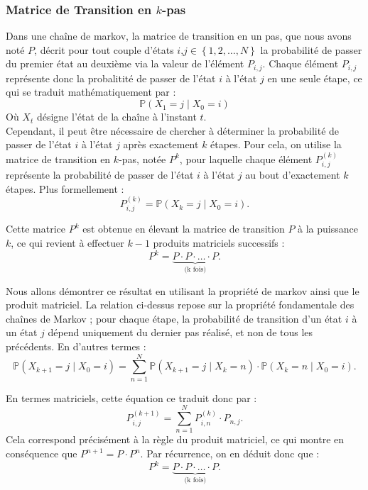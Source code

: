 \documentclass{article}
\begin{document}
\subsubsection{Matrice de Transition en \texorpdfstring{$k$}{k}-pas} %
Dans une chaîne de markov, la matrice de transition en un pas, que nous avons noté $P$, décrit pour tout couple d'états $i$,$j \in \left\{ 1, 2 , \ldots, N \right\}$ la probabilité de passer du premier état au deuxième via la valeur de l'élément $P_{i,j}$. Chaque élément $P_{i,j}$ représente donc la probalitité de passer de l'état $i$ à l'état $j$ en une seule étape, ce qui se traduit mathématiquement par :
\[
\mathbb{P}(X_1 = j \mid X_0 = i)
\]
Où $X_t$ désigne l'état de la chaîne à l'instant $t$. \\

Cependant, il peut être nécessaire de chercher à déterminer la probabilité de passer de l'état $i$ à l'état $j$ après exactement $k$ étapes. Pour cela, on utilise la matrice de transition en $k$-pas, notée $P^k$, pour laquelle chaque élément $P_{i,j}^{(k)}$ représente la probabilité de passer de l'état $i$ à l'état $j$ au bout d'exactement $k$ étapes. Plus formellement :
\[
P_{i,j}^{(k)} = \mathbb{P}(X_k = j \mid X_0 = i).
\]

Cette matrice $P^k$ est obtenue en élevant la matrice de transition $P$ à la puissance $k$, ce qui revient à effectuer $k-1$ produits matriciels successifs :
\[
P^k = \underbrace{P \cdot P \cdot \ldots \cdot P}_\text{(k fois)}.
\]

Nous allons démontrer ce résultat en utilisant la propriété de markov ainsi que le produit matriciel.
La relation ci-dessus repose sur la propriété fondamentale des chaînes de Markov ; pour chaque étape, la probabilité de transition d'un état $i$ à un état $j$ dépend uniquement du dernier pas réalisé, et non de tous les précédents. En d'autres termes :
\[
\mathbb{P}(X_{k+1} = j \mid X_0 = i) = \sum_{n=1}^N \mathbb{P}(X_{k+1} = j \mid X_k = n) \cdot \mathbb{P}(X_k = n \mid X_0 = i).
\]

En termes matriciels, cette équation ce traduit donc par :
\[
P_{i,j}^{(k+1)} = \sum_{n=1}^N P_{i,n}^{(k)} \cdot P_{n,j}.
\]
Cela correspond précisément à la règle du produit matriciel, ce qui montre en conséquence que $P^{n+1} = P \cdot P^n$. Par récurrence, on en déduit donc que :
\[
P^k = \underbrace{P \cdot P \cdot \ldots \cdot P}_\text{(k fois)}.
\]
\end{document}
